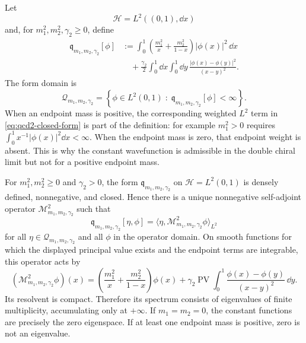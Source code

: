 Let
\[
  \mathcal H=L^2((0,1),\dd x)
\]
and, for \(m_1^2,m_2^2,\gamma_2\geq0\), define
\begin{equation}
\begin{split}
  \mathfrak q_{m_1,m_2,\gamma_2}[\phi]
  &:=
  \int_0^1
  \left(
    \frac{m_1^2}{x}
    +
    \frac{m_2^2}{1-x}
  \right)|\phi(x)|^2\,\dd x
  \\
  &\quad
  +
  \frac{\gamma_2}{2}
  \int_0^1\dd x\int_0^1\dd y\,
  \frac{|\phi(x)-\phi(y)|^2}{(x-y)^2}.
\end{split}
\label{eq:qcd2-closed-form}
\end{equation}
The form domain is
\begin{equation}
  \mathcal Q_{m_1,m_2,\gamma_2}
  =
  \left\{
    \phi\in L^2(0,1)\;:\;
    \mathfrak q_{m_1,m_2,\gamma_2}[\phi]<\infty
  \right\}.
  \label{eq:qcd2-form-domain}
\end{equation}
When an endpoint mass is positive, the corresponding weighted \(L^2\) term in
\eqref{eq:qcd2-closed-form} is part of the definition: for example
\(m_1^2>0\) requires
\(\int_0^1x^{-1}|\phi(x)|^2\dd x<\infty\).  When the endpoint mass is zero,
that endpoint weight is absent.  This is why the constant wavefunction is
admissible in the double chiral limit but not for a positive endpoint mass.

\begin{proposition}
\label{prop:qcd2-self-adjoint-thooft-operator}
For \(m_1^2,m_2^2\geq0\) and \(\gamma_2>0\), the form
\(\mathfrak q_{m_1,m_2,\gamma_2}\) on
\(\mathcal H=L^2(0,1)\) is densely defined, nonnegative, and closed.  Hence
there is a unique nonnegative self-adjoint operator
\(\mathcal M^2_{m_1,m_2,\gamma_2}\) such that
\[
  \mathfrak q_{m_1,m_2,\gamma_2}[\eta,\phi]
  =
  \langle \eta,\mathcal M^2_{m_1,m_2,\gamma_2}\phi\rangle_{L^2}
\]
for all \(\eta\in\mathcal Q_{m_1,m_2,\gamma_2}\) and all
\(\phi\) in the operator domain.  On smooth functions for which the displayed
principal value exists and the endpoint terms are integrable, this operator
acts by
\[
  (\mathcal M^2_{m_1,m_2,\gamma_2}\phi)(x)
  =
  \left(
    \frac{m_1^2}{x}
    +
    \frac{m_2^2}{1-x}
  \right)\phi(x)
  +
  \gamma_2\operatorname{PV}\int_0^1
  \frac{\phi(x)-\phi(y)}{(x-y)^2}\,\dd y .
\]
Its resolvent is compact.  Therefore its spectrum consists of eigenvalues of
finite multiplicity, accumulating only at \(+\infty\).  If
\(m_1=m_2=0\), the constant functions are precisely the zero eigenspace.  If
at least one endpoint mass is positive, zero is not an eigenvalue.
\end{proposition}

